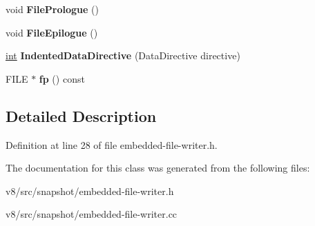 \begin{DoxyCompactItemize}
void {\bfseries File\+Prologue} ()
\item 
\mbox{\label{classv8_1_1internal_1_1PlatformDependentEmbeddedFileWriter_a306bb02e77e250eeee9c483b3ac9a9d6}} 
void {\bfseries File\+Epilogue} ()
\item 
\mbox{\label{classv8_1_1internal_1_1PlatformDependentEmbeddedFileWriter_a72a876fde758ddd97a39d892caad5c95}} 
\mbox{\hyperlink{classint}{int}} {\bfseries Indented\+Data\+Directive} (Data\+Directive directive)
\item 
\mbox{\label{classv8_1_1internal_1_1PlatformDependentEmbeddedFileWriter_a06d83cf4a3021acc79f21f31a9acc694}} 
F\+I\+LE $\ast$ {\bfseries fp} () const
\end{DoxyCompactItemize}


\subsection{Detailed Description}


Definition at line 28 of file embedded-\/file-\/writer.\+h.



The documentation for this class was generated from the following files\+:\begin{DoxyCompactItemize}
\item 
v8/src/snapshot/embedded-\/file-\/writer.\+h\item 
v8/src/snapshot/embedded-\/file-\/writer.\+cc\end{DoxyCompactItemize}
